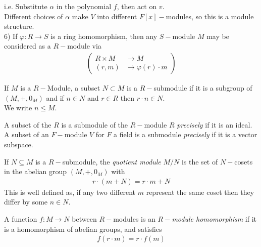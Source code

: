 \documentclass[a4paper]{article}
\begin{document}
\begin{eg}
\begin{equation*}
\end{equation*}
i.e. Substitute $\alpha$ in the polynomial $f$, then act on $v$. \\
Different choices of $\alpha$ make $V$ into different $F[x]-$modules, so this is a module structure.\\
6) If $\varphi: R\to S$ is a ring homomorphism, then any $S-$module $M$ may be considered as a $R-$module via
\begin{equation*}
\begin{aligned}
\left(
\begin{array}{ll}
R\times M &\to M\\
\left(r,m\right) &\to \varphi\left(r\right) \cdot m
\end{array}
\right)
\end{aligned}
\end{equation*}
\end{eg}

\begin{defi}
If $M$ is a $R-$Module, a subset $N\subset M$ is a $R-$submodule if it is a subgroup of $\left(M,+,0_M\right)$ and if $n\in N$ and $r\in R$ then $r\cdot n \in N$.\\
We write $n \leq M$.
\end{defi}

\begin{eg}
A subset of the $R$ is a submodule of the $R-$module $R$ \emph{precisely} if it is an ideal.\\
A subset of an $F-$module $V$ for $F$ a field is a submodule \emph{precisely} if it is a vector subspace.
\end{eg}

\begin{defi}
If $N\subseteq M$ is a $R-$submodule, the \emph{quotient module} $M/N$ is the set of $N-$cosets in the abelian group $\left(M,+,0_M\right)$ with
\begin{equation*}
\begin{aligned}
r\cdot\left(m+N\right) = r\cdot m + N
\end{aligned}
\end{equation*}
This is well defined as, if any two different $m$ represent the same coset then they differ by some $n\in N$.
\end{defi}

\begin{defi}
A function $f:M\to N$ between $R-$modules is an \emph{$R-$module homomorphism} if it is a homomorphism of abelian groups, and satisfies
\begin{equation*}
\begin{aligned}
f\left(r\cdot m\right) = r\cdot f\left(m\right)
\end{aligned}
\end{equation*}
\end{defi}
\end{document}
